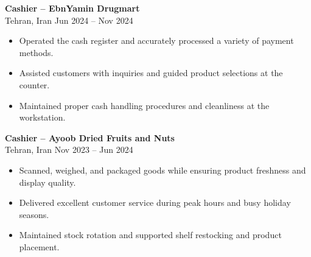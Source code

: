 \documentclass[letterpaper,11pt]{article}
\begin{document}
\textbf{Cashier – EbnYamin Drugmart}\\
Tehran, Iran \hfill Jun 2024 -- Nov 2024
\begin{itemize}[leftmargin=*]
  \item Operated the cash register and accurately processed a variety of payment methods.
  \item Assisted customers with inquiries and guided product selections at the counter.
  \item Maintained proper cash handling procedures and cleanliness at the workstation.
\end{itemize}

\textbf{Cashier – Ayoob Dried Fruits and Nuts}\\
Tehran, Iran \hfill Nov 2023 -- Jun 2024
\begin{itemize}[leftmargin=*]
  \item Scanned, weighed, and packaged goods while ensuring product freshness and display quality.
  \item Delivered excellent customer service during peak hours and busy holiday seasons.
  \item Maintained stock rotation and supported shelf restocking and product placement.
\end{itemize}
\end{document}
